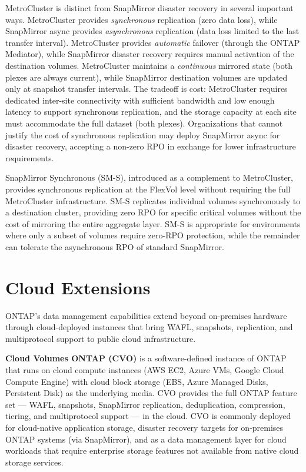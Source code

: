 MetroCluster is distinct from SnapMirror disaster recovery in several important ways. MetroCluster provides \emph{synchronous} replication (zero data loss), while SnapMirror async provides \emph{asynchronous} replication (data loss limited to the last transfer interval). MetroCluster provides \emph{automatic} failover (through the ONTAP Mediator), while SnapMirror disaster recovery requires manual activation of the destination volumes. MetroCluster maintains a \emph{continuous} mirrored state (both plexes are always current), while SnapMirror destination volumes are updated only at snapshot transfer intervals. The tradeoff is cost: MetroCluster requires dedicated inter-site connectivity with sufficient bandwidth and low enough latency to support synchronous replication, and the storage capacity at each site must accommodate the full dataset (both plexes). Organizations that cannot justify the cost of synchronous replication may deploy SnapMirror async for disaster recovery, accepting a non-zero RPO in exchange for lower infrastructure requirements.

SnapMirror Synchronous (SM-S), introduced as a complement to MetroCluster, provides synchronous replication at the FlexVol level without requiring the full MetroCluster infrastructure. SM-S replicates individual volumes synchronously to a destination cluster, providing zero RPO for specific critical volumes without the cost of mirroring the entire aggregate layer. SM-S is appropriate for environments where only a subset of volumes require zero-RPO protection, while the remainder can tolerate the asynchronous RPO of standard SnapMirror.

\section{Cloud Extensions}

ONTAP's data management capabilities extend beyond on-premises hardware through cloud-deployed instances that bring WAFL, snapshots, replication, and multiprotocol support to public cloud infrastructure.

\textbf{Cloud Volumes ONTAP (CVO)} is a software-defined instance of ONTAP that runs on cloud compute instances (AWS EC2, Azure VMs, Google Cloud Compute Engine) with cloud block storage (EBS, Azure Managed Disks, Persistent Disk) as the underlying media. CVO provides the full ONTAP feature set --- WAFL, snapshots, SnapMirror replication, deduplication, compression, tiering, and multiprotocol support --- in the cloud. CVO is commonly deployed for cloud-native application storage, disaster recovery targets for on-premises ONTAP systems (via SnapMirror), and as a data management layer for cloud workloads that require enterprise storage features not available from native cloud storage services.

